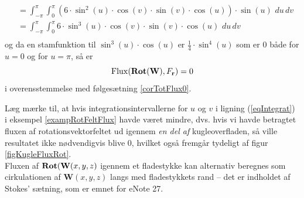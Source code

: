 \begin{example}
\begin{equation}
\begin{aligned}
&= \int_{-\pi}^{\pi}\int_{0}^{\pi} \left( 6 \cdot \sin^{2}(u) \cdot \cos(v) \cdot \sin(v) \cdot \cos(u)\right) \cdot \sin(u) \,\, du \, dv \\
&= \int_{-\pi}^{\pi}\int_{0}^{\pi} 6 \cdot \sin^{3}(u) \cdot \cos(v) \cdot \sin(v) \cdot \cos(u) \,\, du \, dv \\
\end{aligned}
\end{equation}
og da en stamfunktion til $\sin^{3}(u)\cdot \cos(u)$ er $\frac{1}{4}\cdot \sin^{4}(u)$ som er $0$ både for $u=0$ og for $u=\pi$,
så er
\begin{equation}
\operatorname{Flux}(\operatorname{\mathbf{Rot}}(\mathbf{W}), F_{\mathbf{r}}) = 0
\end{equation}
i overensstemmelse med følgesætning \ref{corTotFlux0}.
\end{example}

\begin{think}
Læg mærke til, at hvis integrationsintervallerne for $u$ og $v$  i ligning (\ref{eqIntegrat}) i eksempel \ref{exampRotFeltFlux}  havde været
mindre, dvs. hvis vi havde betragtet fluxen af rotationsvektorfeltet ud igennem \emph{en del af} kugleoverfladen, så ville resultatet ikke nødvendigvis blive $0$, hvilket også fremgår tydeligt af figur \ref{figKugleFluxRot}. \\

Fluxen af $\operatorname{\mathbf{Rot}}(\mathbf{W}(x,y,z)$ igennem et fladestykke kan alternativ beregnes som cirkulationen  af $\mathbf{W}(x,y,z)$ langs med fladestykkets rand -- det er indholdet af Stokes' sætning, som er emnet for eNote 27.
\end{think}



